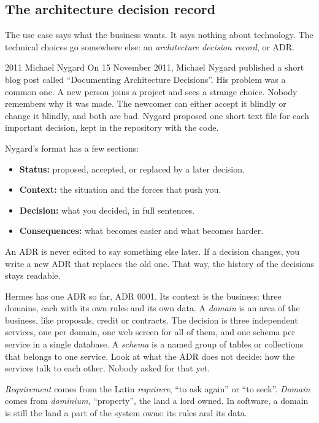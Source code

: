 \subsection*{The architecture decision record}

The use case says what the business wants. It says nothing about technology.
The technical choices go somewhere else: an \emph{architecture decision
record}, or ADR.

\begin{history}{2011 \textperiodcentered{} Michael Nygard}
On 15 November 2011, Michael Nygard published a short blog post called
``Documenting Architecture Decisions''. His problem was a common one. A new
person joins a project and sees a strange choice. Nobody remembers why it was
made. The newcomer can either accept it blindly or change it blindly, and
both are bad. Nygard proposed one short text file for each important
decision, kept in the repository with the code.
\end{history}

Nygard's format has a few sections:

\begin{itemize}
  \item \textbf{Status:} proposed, accepted, or replaced by a later decision.
  \item \textbf{Context:} the situation and the forces that push you.
  \item \textbf{Decision:} what you decided, in full sentences.
  \item \textbf{Consequences:} what becomes easier and what becomes harder.
\end{itemize}

An ADR is never edited to say something else later. If a decision changes, you
write a new ADR that replaces the old one. That way, the history of the
decisions stays readable.

Hermes has one ADR so far, ADR 0001. Its context is the business: three
domains, each with its own rules and its own data. A \emph{domain} is an area
of the business, like proposals, credit or contracts. The decision is three
independent services, one per domain, one web screen for all of them, and one
schema per service in a single database. A \emph{schema} is a named group of
tables or collections that belongs to one service. Look at what the ADR does
not decide: how the services talk to each other. Nobody asked for that yet.

\begin{etymology}
\emph{Requirement} comes from the Latin \emph{requirere}, ``to ask again'' or
``to seek''. \emph{Domain} comes from \emph{dominium}, ``property'', the land
a lord owned. In software, a domain is still the land a part of the system
owns: its rules and its data.
\end{etymology}

